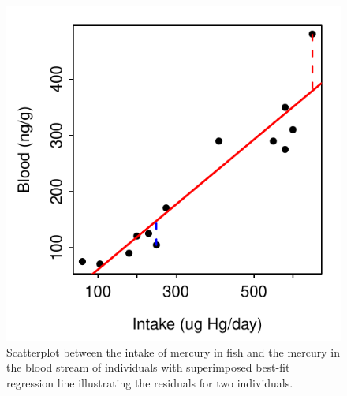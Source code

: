 \documentclass[10pt,openany]{book}\usepackage[]{graphicx}\usepackage[]{color}
\newenvironment{knitrout}{}{} %
\begin{document}
\begin{knitrout}
\color{fgcolor}\begin{figure}[hbtp]

{\centering \includegraphics[width=.4\linewidth]{Figs/HGresidual-1} 

}

\caption[Scatterplot between the intake of mercury in fish and the mercury in the blood stream of individuals with superimposed best-fit regression line illustrating the residuals for two individuals]{Scatterplot between the intake of mercury in fish and the mercury in the blood stream of individuals with superimposed best-fit regression line illustrating the residuals for two individuals.}\label{fig:HGresidual}
\end{figure}


\end{knitrout}
\end{document}

